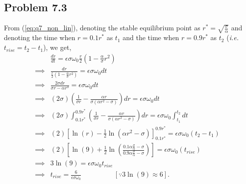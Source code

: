\subsection*{Problem 7.3}
From (\ref{eq:q7_non_lin}), denoting the stable equilibrium point as $r^* = \sqrt{\frac{\sigma}{\alpha}}$ and denoting the time when $r=0.1r^*$ as $t_1$ and the time when $r=0.9r^*$ as $t_2$ (\textit{i.e.} $t_{rise} = t_2-t_1$), we get,
\begin{align*}
	& \frac{dr}{dt} = \epsilon\sigma\omega_0\frac{r}{2}\left(1-\frac{\alpha}{\sigma}r^2\right)\\
	\implies & \frac{dr}{\frac{r}{2}\left(1-\frac{\alpha}{\sigma}r^2\right)} = \epsilon\sigma\omega_0 dt\\
	\implies & \frac{2 \sigma dr}{\sigma r - \alpha r^3} = \epsilon \sigma \omega_0 dt\\
	\implies & (2\sigma)\left(\frac{1}{\sigma r} - \frac{\alpha r}{\sigma(\alpha r^2-\sigma)}\right)dr = \epsilon\sigma\omega_0 dt\\
	\implies & (2 \sigma) \int_{0.1r^*}^{0.9r^*} \left(\frac{1}{\sigma r}-\frac{\alpha r}{\sigma(\alpha r^2-\sigma)}\right)dr = \epsilon \sigma\omega_0 \int_{t_1}^{t_2} dt\\
	\implies & (2)\left[\ln(r)-\frac{1}{2}\ln(\alpha r^2-\sigma)\right]_{0.1r^*}^{0.9r^*} = \epsilon\sigma\omega_0(t_2-t_1)\\
	\implies & (2)\left[\ln(9)+\frac{1}{2}\ln\left(\frac{0.1\alpha\frac{\sigma}{\alpha}-\sigma}{0.9\alpha\frac{\sigma}{\alpha}-\sigma}\right)\right] = \epsilon\sigma\omega_0(t_{rise})\\
	\implies & 3 \ln (9) = \epsilon\sigma\omega_0t_{rise}\\
	\implies & t_{rise} = \frac{6}{\epsilon\sigma\omega_0} \hspace{2cm}[\because 3\ln(9) \approx 6].
\end{align*}

